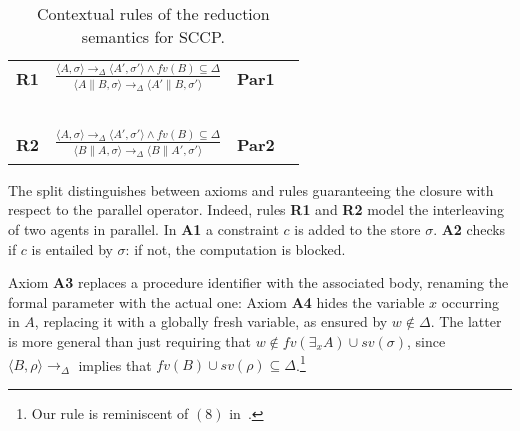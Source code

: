 \documentclass{llncs}
\newcommand{\rarrow}{\rightarrow}
\begin{document}
\begin{table}  %
   \begin{center}
   \begin{tabular}{llll} 
  \mbox{\bf R1}& $\frac {\displaystyle \langle A,\sigma \rangle \rightarrow_\Delta \langle A', \sigma' \rangle
  \wedge fv(B) \subseteq \Delta} 
  {\displaystyle \begin{array}{l}
                          \langle A\parallel B, \sigma \rangle \rightarrow_\Delta \langle A'\parallel B, \sigma' \rangle
                          \end{array}}$ 
    & \bf{Par1}&
  \\
  & \mbox{   }&\mbox{   }&
  \\
    \mbox{\bf R2}& $\frac {\displaystyle \langle A,\sigma \rangle \rightarrow_\Delta \langle A', \sigma'   \rangle
    	\wedge fv(B) \subseteq \Delta} 
    {\displaystyle 
    	\begin{array}{l} \langle B\parallel A, \sigma \rangle \rightarrow_\Delta \langle B\parallel A', \sigma' \rangle
    	\end{array}}$& \bf{Par2}&
  \end{tabular}
  \end{center}
\caption{Contextual rules of the reduction semantics for SCCP.}
\label{fig:operational2}
\end{table}

The split distinguishes between axioms and rules guaranteeing the closure with respect to the parallel operator. Indeed, rules {\bf  R1}  and {\bf  R2} model the interleaving of two agents in parallel.
%
%
In {\bf A1} a constraint $c$ is added to the store $\sigma$.
%
{\bf A2} checks if $c$ is entailed by  $\sigma$: if not, the computation is blocked.

Axiom {\bf A3} replaces a procedure identifier with the associated body, renaming the formal parameter with the actual one:
%
Axiom {\bf A4} hides the variable $x$ occurring in $A$, replacing it  
with a globally fresh variable,
as ensured by $w \not \in \Delta$.
The latter is more general than just requiring that 
$w \not \in fv(\exists_x A) \cup sv(\sigma)$, since
$\langle B, \rho \rangle   \rarrow_\Delta$ implies that 
$fv(B) \cup sv(\rho) \subseteq \Delta$.\footnote{Our rule is  reminiscent of 
$(8)$ in~\cite[p.~342]{popl91}.}
\end{document}
